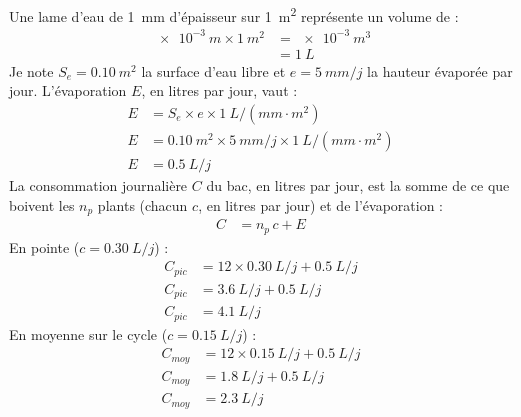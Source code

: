 \begin{demonstration}
Une lame d'eau de \qty{1}{mm} d'épaisseur sur \qty{1}{m^2} représente un volume de :
\begin{align*}
\qty{e-3}{m}\times\qty{1}{m^2} &= \qty{e-3}{m^3}\\
&= \qty{1}{L}
\end{align*}
Je note $S_e = \qty{0,10}{m^2}$ la surface d'eau libre et $e = \qty{5}{mm/j}$ la hauteur évaporée par jour. L'évaporation $E$, en litres par jour, vaut :
\begin{align*}
E &= S_e \times e \times \qty{1}{L/(mm\cdot m^2)}\\
E &= \qty{0,10}{m^2}\times\qty{5}{mm/j}\times\qty{1}{L/(mm\cdot m^2)}\\
E &= \qty{0,5}{L/j}
\end{align*}
La consommation journalière $C$ du bac, en litres par jour, est la somme de ce que boivent les $n_p$ plants (chacun $c$, en litres par jour) et de l'évaporation :
\begin{align*}
C &= n_p\,c + E
\end{align*}
En pointe ($c = \qty{0,30}{L/j}$) :
\begin{align*}
C_{pic} &= 12\times\qty{0,30}{L/j} + \qty{0,5}{L/j}\\
C_{pic} &= \qty{3,6}{L/j} + \qty{0,5}{L/j}\\
C_{pic} &= \qty{4,1}{L/j}
\end{align*}
En moyenne sur le cycle ($c = \qty{0,15}{L/j}$) :
\begin{align*}
C_{moy} &= 12\times\qty{0,15}{L/j} + \qty{0,5}{L/j}\\
C_{moy} &= \qty{1,8}{L/j} + \qty{0,5}{L/j}\\
C_{moy} &= \qty{2,3}{L/j}
\end{align*}
\end{demonstration}

